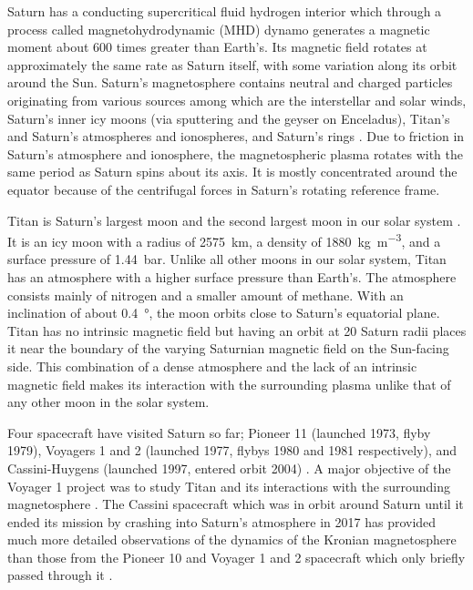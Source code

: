 \documentclass[12pt, parskip=full*, abstract]{scrartcl}
\begin{document}
Saturn has a conducting supercritical fluid hydrogen interior which through a process called magnetohydrodynamic (MHD) dynamo generates a magnetic moment about 600 times greater than Earth's. Its magnetic field rotates at approximately the same rate as Saturn itself, with some variation along its orbit around the Sun. Saturn's magnetosphere contains neutral and charged particles originating from various sources among which are the interstellar and solar winds, Saturn's inner icy moons (via sputtering and the geyser on Enceladus), Titan's and Saturn's atmospheres and ionospheres, and Saturn's rings \parencite{solar-system-magnetospheres}. Due to friction in Saturn's atmosphere and ionosphere, the magnetospheric plasma rotates with the same period as Saturn spins about its axis. It is mostly concentrated around the equator because of the centrifugal forces in Saturn's rotating reference frame.

Titan is Saturn's largest moon and the second largest moon in our solar system \parencite{fundamental-planetary-science}. It is an icy moon with a radius of \SI{2575}{\kilo\metre}, a density of \SI{1880}{\kilogram\per\metre^3}, and a surface pressure of \SI{1.44}{\bar}. Unlike all other moons in our solar system, Titan has an atmosphere with a higher surface pressure than Earth's. The atmosphere consists mainly of nitrogen and a smaller amount of methane. With an inclination of about \SI{0.4}{\degree}, the moon orbits close to Saturn's equatorial plane. Titan has no intrinsic magnetic field but having an orbit at 20 Saturn radii places it near the boundary of the varying Saturnian magnetic field on the Sun-facing side. This combination of a dense atmosphere and the lack of an intrinsic magnetic field makes its interaction with the surrounding plasma unlike that of any other moon in the solar system. 

Four spacecraft have visited Saturn so far; Pioneer 11 (launched 1973, flyby 1979), Voyagers 1 and 2 (launched 1977, flybys 1980 and 1981 respectively), and Cassini-Huygens (launched 1997, entered orbit 2004) \parencite{encyclopedia-missions,cassini-2019}. A major objective of the Voyager 1 project was to study Titan and its interactions with the surrounding magnetosphere \parencite{hartle-1982}. The Cassini spacecraft which was in orbit around Saturn until it ended its mission by crashing into Saturn's atmosphere in 2017 \parencite{cassini-2019} has provided much more detailed observations of the dynamics of the Kronian magnetosphere than those from the Pioneer 10 and Voyager 1 and 2 spacecraft which only briefly passed through it \parencite{encyclopedia-magnetospheres}. 
\end{document}
